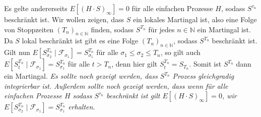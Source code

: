 \documentclass{article}
\begin{document}
Es gelte andererseits $E[(H\cdot S)_\infty]=0$ für alle einfachen Prozesse $H$, sodass $S^{\tau_n}$ beschränkt ist.
Wir wollen zeigen, dass $S$ ein lokales Martingal ist, also eine Folge von Stoppzeiten $(T_n)_{n\in\mathbb{N}}$ finden, sodass $S^{T_n}$ für jedes $n\in\mathbb{N}$ ein Martingal ist.
Da $S$ lokal beschränkt ist gibt es eine Folge $(T_n)_{n\in\mathbb{N}}$, sodass $S^{T_n}$ beschränkt ist.
Gilt nun $E[S_{\sigma_2}^{T_n}\mid \mathscr{F}_{\sigma_1}]=S^{T_n}_{\sigma_1}$ für alle $\sigma_1\leq\sigma_2\leq T_n$, so gilt auch $E[S^{T_n}_t\mid\mathscr{F}_{\sigma_1}]=S^{T_n}_{\sigma_1}$ für alle $t>T_n$, denn hier gilt $S^{T_n}_t=S_{T_n}$.
Somit ist $S^{T_n}$ dann ein Martingal.
\emph{Es sollte noch gezeigt werden, dass $S^{T_n}$ Prozess gleichgradig integrierbar ist.}
\emph{Außerdem sollte noch gezeigt werden, dass wenn für alle einfachen Prozesse $H$ sodass $S^{\tau_n}$ beschränkt ist gilt $E[(H\cdot S)_\infty]=0$, wir $E[S^{T_n}_{\sigma_2}\mid\mathscr{F}_{\sigma_1}]=S^{T_n}_{\sigma_1}$ erhalten.}
\end{document}
